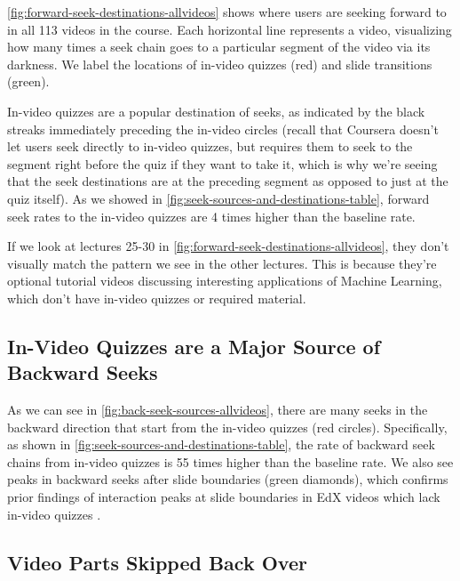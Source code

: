 \documentclass{sigchi}
\begin{document}
\autoref{fig:forward-seek-destinations-allvideos} shows where users are seeking forward to in all 113 videos in the course. Each horizontal line represents a video, visualizing how many times a seek chain goes to a particular segment of the video via its darkness. We label the locations of in-video quizzes (red) and slide transitions (green). %

In-video quizzes are a popular destination of seeks, as indicated by the black streaks immediately preceding the in-video circles (recall that Coursera doesn't let users seek directly to in-video quizzes, but requires them to seek to the segment right before the quiz if they want to take it, which is why we're seeing that the seek destinations are at the preceding segment as opposed to just at the quiz itself). As we showed in \autoref{fig:seek-sources-and-destinations-table}, forward seek rates to the in-video quizzes are 4 times higher than the baseline rate.

If we look at lectures 25-30 in \autoref{fig:forward-seek-destinations-allvideos}, they don't visually match the pattern we see in the other lectures. This is because they're optional tutorial videos discussing interesting applications of Machine Learning, which don't have in-video quizzes or required material.


\subsection{In-Video Quizzes are a Major Source of Backward Seeks}

As we can see in \autoref{fig:back-seek-sources-allvideos}, there are many seeks in the backward direction that start from the in-video quizzes (red circles). Specifically, as shown in \autoref{fig:seek-sources-and-destinations-table}, the rate of backward seek chains from in-video quizzes is 55 times higher than the baseline rate. We also see peaks in backward seeks after slide boundaries (green diamonds), which confirms prior findings of interaction peaks at slide boundaries in EdX videos which lack in-video quizzes \cite{juho}.

\subsection{Video Parts Skipped Back Over}
\end{document}
